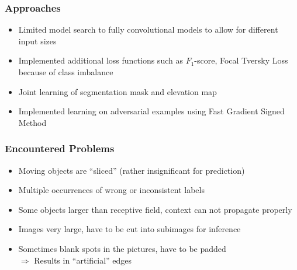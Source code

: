 \documentclass{beamer}
\begin{document}
\begin{frame}
\frametitle{Approaches}
\begin{itemize}
\item Limited model search to fully convolutional models to allow for different input sizes
\item Implemented additional loss functions such as $F_1$-score, Focal Tversky Loss because of class imbalance
\item Joint learning of segmentation mask and elevation map
\item Implemented learning on adversarial examples using Fast Gradient Signed Method
\end{itemize}
\end{frame}

\begin{frame}
\frametitle{Encountered Problems}
\begin{itemize}
\item Moving objects are ``sliced'' (rather insignificant for prediction)
\item Multiple occurrences of wrong or inconsistent labels
\item Some objects larger than receptive field, context can not propagate properly
\item Images very large, have to be cut into subimages for inference
\item Sometimes blank spots in the pictures, have to be padded\\
$\Rightarrow$ Results in ``artificial'' edges
\end{itemize}
\begin{minipage}{0.3\textwidth}
\begin{figure}
\end{figure}

\end{minipage}
\end{frame}
\end{document}
